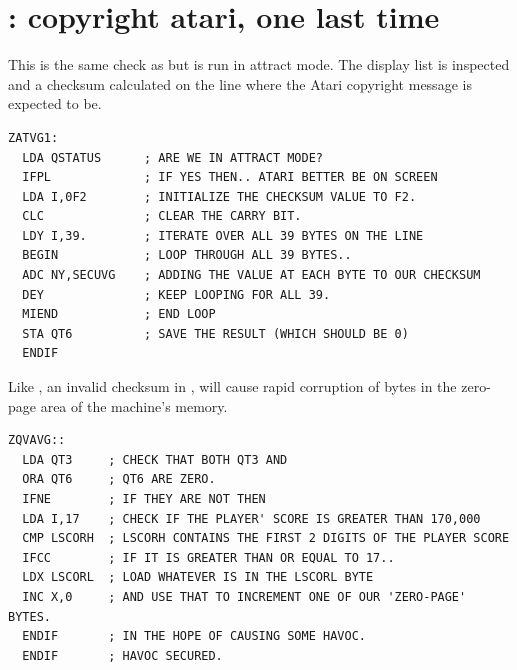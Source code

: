 \section*{: copyright atari, one last time}
This is the same check as  but is run in attract mode. The display list
is inspected and a checksum calculated on the line where the Atari copyright message
is expected to be.
\begin{lstlisting}
ZATVG1:
  LDA QSTATUS      ; ARE WE IN ATTRACT MODE?
  IFPL             ; IF YES THEN.. ATARI BETTER BE ON SCREEN
  LDA I,0F2        ; INITIALIZE THE CHECKSUM VALUE TO F2.
  CLC              ; CLEAR THE CARRY BIT.
  LDY I,39.        ; ITERATE OVER ALL 39 BYTES ON THE LINE
  BEGIN            ; LOOP THROUGH ALL 39 BYTES..
  ADC NY,SECUVG    ; ADDING THE VALUE AT EACH BYTE TO OUR CHECKSUM
  DEY              ; KEEP LOOPING FOR ALL 39.
  MIEND            ; END LOOP
  STA QT6          ; SAVE THE RESULT (WHICH SHOULD BE 0)
  ENDIF
\end{lstlisting}

Like , an invalid checksum in , will cause rapid corruption
of bytes in the zero-page area of the machine's memory. 
\begin{lstlisting}
ZQVAVG::
  LDA QT3     ; CHECK THAT BOTH QT3 AND
  ORA QT6     ; QT6 ARE ZERO.
  IFNE        ; IF THEY ARE NOT THEN
  LDA I,17    ; CHECK IF THE PLAYER' SCORE IS GREATER THAN 170,000
  CMP LSCORH  ; LSCORH CONTAINS THE FIRST 2 DIGITS OF THE PLAYER SCORE
  IFCC        ; IF IT IS GREATER THAN OR EQUAL TO 17..
  LDX LSCORL  ; LOAD WHATEVER IS IN THE LSCORL BYTE
  INC X,0     ; AND USE THAT TO INCREMENT ONE OF OUR 'ZERO-PAGE' BYTES.
  ENDIF       ; IN THE HOPE OF CAUSING SOME HAVOC.
  ENDIF       ; HAVOC SECURED.
\end{lstlisting}

